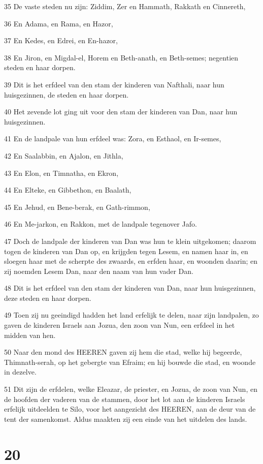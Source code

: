 \par 35 De vaste steden nu zijn: Ziddim, Zer en Hammath, Rakkath en Cinnereth,
\par 36 En Adama, en Rama, en Hazor,
\par 37 En Kedes, en Edrei, en En-hazor,
\par 38 En Jiron, en Migdal-el, Horem en Beth-anath, en Beth-semes; negentien steden en haar dorpen.
\par 39 Dit is het erfdeel van den stam der kinderen van Nafthali, naar hun huisgezinnen, de steden en haar dorpen.
\par 40 Het zevende lot ging uit voor den stam der kinderen van Dan, naar hun huisgezinnen.
\par 41 En de landpale van hun erfdeel was: Zora, en Esthaol, en Ir-semes,
\par 42 En Saalabbin, en Ajalon, en Jithla,
\par 43 En Elon, en Timnatha, en Ekron,
\par 44 En Elteke, en Gibbethon, en Baalath,
\par 45 En Jehud, en Bene-berak, en Gath-rimmon,
\par 46 En Me-jarkon, en Rakkon, met de landpale tegenover Jafo.
\par 47 Doch de landpale der kinderen van Dan was hun te klein uitgekomen; daarom togen de kinderen van Dan op, en krijgden tegen Lesem, en namen haar in, en sloegen haar met de scherpte des zwaards, en erfden haar, en woonden daarin; en zij noemden Lesem Dan, naar den naam van hun vader Dan.
\par 48 Dit is het erfdeel van den stam der kinderen van Dan, naar hun huisgezinnen, deze steden en haar dorpen.
\par 49 Toen zij nu geeindigd hadden het land erfelijk te delen, naar zijn landpalen, zo gaven de kinderen Israels aan Jozua, den zoon van Nun, een erfdeel in het midden van hen.
\par 50 Naar den mond des HEEREN gaven zij hem die stad, welke hij begeerde, Thimnath-serah, op het gebergte van Efraim; en hij bouwde die stad, en woonde in dezelve.
\par 51 Dit zijn de erfdelen, welke Eleazar, de priester, en Jozua, de zoon van Nun, en de hoofden der vaderen van de stammen, door het lot aan de kinderen Israels erfelijk uitdeelden te Silo, voor het aangezicht des HEEREN, aan de deur van de tent der samenkomst. Aldus maakten zij een einde van het uitdelen des lands.

\chapter{20}

